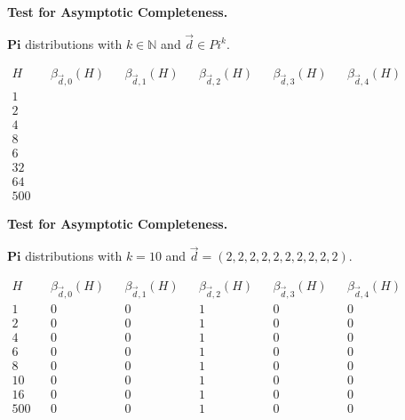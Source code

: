 \documentclass{beamer}
\newcommand{\N}{\mathbb N}
\newcommand{\B}{\beta}
\newcommand{\vd}{\vec{d}}
\begin{document}
\begin{frame}
\textbf{Test for Asymptotic Completeness.}
\smallskip
\pause

$\mathbf{Pi}$ distributions with $k\in \N$ and  $\vd \in Pi^k$.
\vspace{-4mm}

\begin{align*}
 H               &&\B_{\vd,0}(H)&&\B_{\vd,1}(H)&&\B_{\vd,2}(H)&&\B_{\vd,3}(H)&&\B_{\vd,4}(H)   &&&&&\\
1	         &&			&&			&&			&&			&&		      &&&&&\\
2		&&			&&			&&			&&			&&		      &&&&&\\
4		&&			&&			&&			&&			&&		      &&&&&\\
8		&&			&&			&&			&&			&&		      &&&&&\\
6		&&			&&			&&			&&			&&		      &&&&&\\
32		&&			&&			&&			&&			&&		      &&&&&\\
64		&&			&&			&&			&&			&&		      &&&&&\\
500		&&			&&			&&			&&			&&		      &&&&&
\end{align*}

\end{frame}







\begin{frame}
\vspace{2.3mm}
\textbf{Test for Asymptotic Completeness.}
\vspace{1.2mm}

$\mathbf{Pi}$ distributions with $k=10$ and  $\vd = (2,2,2,2,2,2,2,2,2,2)$.
\vspace{-4mm}
\pause

\begin{align*}
 H               &&\B_{\vd,0}(H)&&\B_{\vd,1}(H)&&\B_{\vd,2}(H)&&\B_{\vd,3}(H)&&\B_{\vd,4}(H)   &&&&&\\
1	         &&	0		&&	0		&&	1		&&	0		&&	0	      &&&&&\\
2		&&	0		&&	0		&&	1		&&	0		&&	0	      &&&&&\\
4		&&	0		&&	0		&&	1		&&	0		&&	0	      &&&&&\\
6		&&	0		&&	0		&&	1		&&	0		&&	0	      &&&&&\\
8		&&	0		&&	0		&&	1		&&	0		&&	0	      &&&&&\\
10		&&	0		&&	0		&&	1		&&	0		&&	0	      &&&&&\\
16		&&	0		&&	0		&&	1		&&	0		&&	0	      &&&&&\\
500		&&	0		&&	0		&&	1		&&	0		&&	0	      &&&&&\\
\end{align*}

\end{frame}
\end{document}
